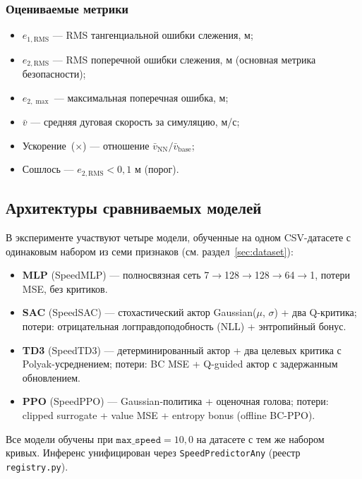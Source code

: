\subsubsection*{Оцениваемые метрики}

\begin{itemize}
    \item $e_{1,\mathrm{RMS}}$ — RMS тангенциальной ошибки слежения, м;
    \item $e_{2,\mathrm{RMS}}$ — RMS поперечной ошибки слежения, м (основная метрика безопасности);
    \item $e_{2,\max}$ — максимальная поперечная ошибка, м;
    \item $\bar{v}$ — средняя дуговая скорость за симуляцию, м/с;
    \item Ускорение~($\times$) — отношение $\bar{v}_\mathrm{NN} / \bar{v}_\mathrm{base}$;
    \item Сошлось — $e_{2,\mathrm{RMS}} < 0{,}1$ м (порог).
\end{itemize}

\subsection{Архитектуры сравниваемых моделей}

В эксперименте участвуют четыре модели, обученные на одном CSV-датасете с одинаковым набором из семи признаков (см. раздел~\ref{sec:dataset}):

\begin{itemize}
    \item \textbf{MLP} (SpeedMLP) — полносвязная сеть 7$\to$128$\to$128$\to$64$\to$1, потери MSE, без критиков.
    \item \textbf{SAC} (SpeedSAC) — стохастический актор Gaussian($\mu$, $\sigma$) + два Q-критика; потери: отрицательная логправдоподобность (NLL) + энтропийный бонус.
    \item \textbf{TD3} (SpeedTD3) — детерминированный актор + два целевых критика с Polyak-усреднением; потери: BC MSE + Q-guided актор с задержанным обновлением.
    \item \textbf{PPO} (SpeedPPO) — Gaussian-политика + оценочная голова; потери: clipped surrogate + value MSE + entropy bonus (offline BC-PPO).
\end{itemize}

Все модели обучены при $\texttt{max\_speed} = 10{,}0$ на датасете с тем же набором кривых. Инференс унифицирован через \texttt{SpeedPredictorAny} (реестр \texttt{registry.py}).

